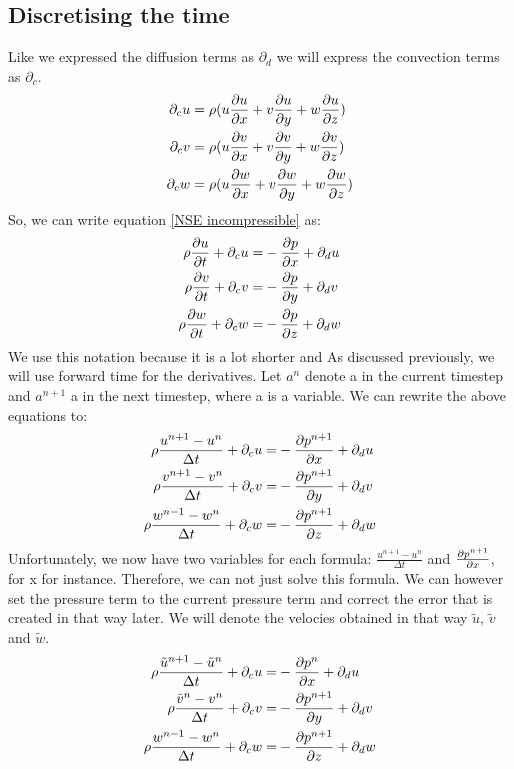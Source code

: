 \documentclass{article}
\begin{document}
\subsection{Discretising the time}
Like we expressed the diffusion terms as \(\partial _{d}\) we will express the convection terms as \(\partial _{c}\)\cite{MAC}.
\[
\begin{split}
  \partial _cu=\rho(&u\pdv{u}{x}+v\pdv{u}{y}+w\pdv{u}{z})\\
  \partial _cv=\rho(&u\pdv{v}{x}+v\pdv{v}{y}+w\pdv{v}{z})\\
  \partial _cw=\rho(&u\pdv{w}{x}+v\pdv{w}{y}+w\pdv{w}{z})
\end{split}
\]
So, we can write equation \ref{NSE incompressible} as\cite{MAC}:
\[
\begin{split}
  \rho \pdv{u}{t} + \partial _cu=&-\pdv{p}{x}+\partial _du\\
  \rho \pdv{v}{t} + \partial _cv=&-\pdv{p}{y}+\partial _dv\\
  \rho \pdv{w}{t} + \partial _cw=&-\pdv{p}{z}+\partial _dw
\end{split}
\]
We use this notation because it is a lot shorter and As discussed previously, we will use forward time for the derivatives. Let \(a^n\) denote a in the current timestep and \(a^{n+1}\) a in the next timestep, where a is a variable. We can rewrite the above equations to: \cite{MAC}
\[
\begin{split}
  \rho \frac{u^{n+1}-u^n}{\Delta t} + \partial _cu=&-\pdv{p^{n+1}}{x}+\partial _du\\
  \rho \frac{v^{n+1}-v^n}{\Delta t} + \partial _cv=&-\pdv{p^{n+1}}{y}+\partial _dv\\
  \rho \frac{w^{n-1}-w^n}{\Delta t} + \partial _cw=&-\pdv{p^{n+1}}{z}+\partial _dw
\end{split}
\]
Unfortunately, we now have two variables for each formula: \(\frac{u^{n+1}-u^n}{\Delta t}\) and \(\pdv{p^{n+1}}{x}\), for x for instance. Therefore, we can not just solve this formula. We can however set the pressure term to the current pressure term and correct the error that is created in that way later. We will denote the velocies obtained in that way \(\tilde{u}\), \(\tilde{v}\) and \(\tilde{w}\).
\[
\begin{split}
  \rho \frac{\tilde{u}^{n+1}-\tilde{u}^n}{\Delta t} + \partial _cu=&-\pdv{p^{n}}{x}+\partial _du\\
  \rho \frac{\tilde{v}^{n}-v^n}{\Delta t} + \partial _cv=&-\pdv{p^{n+1}}{y}+\partial _dv\\
  \rho \frac{w^{n-1}-w^n}{\Delta t} + \partial _cw=&-\pdv{p^{n+1}}{z}+\partial _dw
\end{split}
\]
\end{document}
